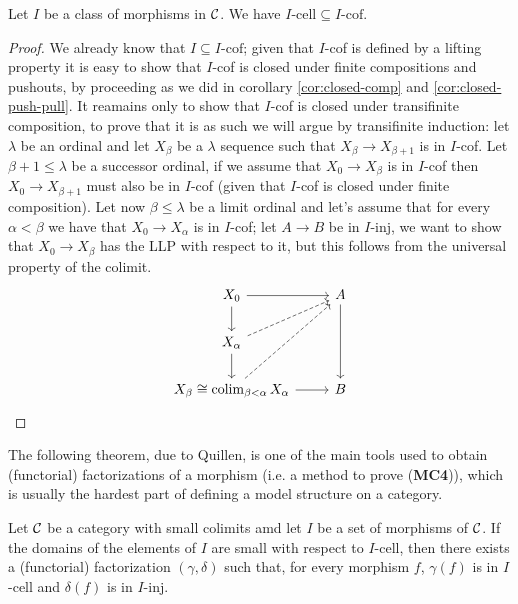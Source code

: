 \begin{lemma}
	Let $I$ be a class of morphisms in $\mathcal{C}$. We have $I\text{-cell} \subseteq I\text{-cof}$.
\end{lemma}
\begin{proof}
	We already know that $I \subseteq I\text{-cof}$; given that $I$-cof is defined by a lifting property it is easy to show that $I$-cof is closed under finite compositions and pushouts, by proceeding as we did in corollary \ref{cor:closed-comp} and \ref{cor:closed-push-pull}. It reamains only to show that $I$-cof is closed under transifinite composition, to prove that it is as such we will argue by transifinite induction: let $\lambda$ be an ordinal and let $X_\beta$ be a $\lambda$ sequence such that $X_\beta \longrightarrow X_{\beta+1}$ is in $I$-cof. Let $\beta+1 \leq \lambda$ be a successor ordinal, if we assume that $X_0 \longrightarrow X_\beta$ is in $I$-cof then $X_0 \longrightarrow X_{\beta+1}$ must also be in $I$-cof (given that $I$-cof is closed under finite composition). Let now $\beta \leq \lambda$ be a limit ordinal and let's assume that for every $\alpha < \beta$ we have that $X_0 \longrightarrow X_\alpha$ is in $I$-cof; let $A\longrightarrow B$ be in $I$-inj, we want to show that $X_0 \longrightarrow X_\beta$ has the LLP with respect to it, but this follows from the universal property of the colimit.
	\[\begin{tikzcd}
		{X_0} & A \\
		{X_\alpha} \\
		{X_\beta \cong \colim_{\beta<\alpha}X_\alpha} & B
		\arrow[from=1-1, to=1-2]
		\arrow[from=1-1, to=2-1]
		\arrow[from=1-2, to=3-2]
		\arrow[dashed, from=2-1, to=1-2]
		\arrow[from=2-1, to=3-1]
		\arrow[dashed, from=3-1, to=1-2]
		\arrow[from=3-1, to=3-2]
	\end{tikzcd}\]
	
\end{proof}

The following theorem, due to Quillen, is one of the main tools used to obtain (functorial) factorizations of a morphism (i.e. a method to prove (\textbf{MC4})), which is usually the hardest part of defining a model structure on a category.

\begin{theorem}
	Let $\mathcal{C}$ be a category with small colimits amd let $I$ be a set of morphisms of $\mathcal{C}$. If the domains of the elements of $I$ are small with respect to $I$-cell, then there exists a (functorial) factorization $(\gamma, \delta)$ such that, for every morphism $f$, $\gamma(f)$ is in $I$-cell and $\delta(f)$ is in $I$-inj.
\end{theorem}

